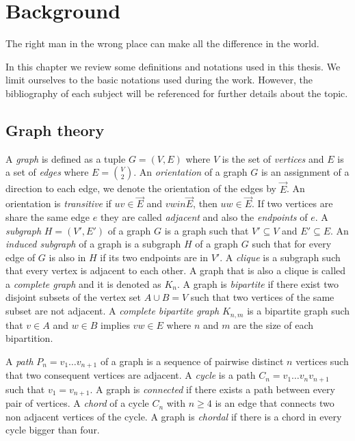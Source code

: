 \chapter{Background}
\label{chap:background}

\begin{fquote}
  The right man in the wrong place can make all the difference in the world.
\end{fquote}

In this chapter we review some definitions and notations used in this thesis. We limit ourselves to the basic notations used during the work. However, the bibliography of each subject will be referenced for further details about the topic.


%
%
%

\section{Graph theory}

A \emph{graph} is defined as a tuple $G = (V,E)$ where $V$ is the set of \emph{vertices} and $E$ is a set of \emph{edges} where $E = \binom{V}{2}$. An \emph{orientation} of a graph $G$ is an assignment of a direction to each edge, we denote the orientation of the edges by $\overrightarrow{E}$. An orientation is \emph{transitive} if $uv \in \overrightarrow{E}$ and $vw in \overrightarrow{E}$, then $uw \in \overrightarrow{E}$. If two vertices are share the same edge $e$ they are called \emph{adjacent} and also the \emph{endpoints} of $e$. A \emph{subgraph} $H = (V', E')$ of a graph $G$ is a graph such that $V' \subseteq V$ and $E' \subseteq E$. An \emph{induced subgraph} of a graph is a subgraph $H$ of a graph $G$ such that for every edge of $G$ is also in $H$ if its two endpoints are in $V'$. A \emph{clique} is a subgraph such that every vertex is adjacent to each other. A graph that is also a clique is called a \emph{complete graph} and it is denoted as $K_n$. A graph is \emph{bipartite} if there exist two disjoint subsets of the vertex set $A \cup B = V$ such that two vertices of the same subset are not adjacent. A \emph{complete bipartite graph} $K_{n,m}$ is a bipartite graph such that $v \in A$ and $w \in B$ implies $vw \in E$ where $n$ and $m$ are the size of each bipartition.

A \emph{path} $P_n = v_1\dots v_{n+1}$ of a graph is a sequence of pairwise distinct $n$ vertices such that two consequent vertices are adjacent. A \emph{cycle} is a path $C_n = v_1\dots v_nv_{n+1}$ such that $v_1=v_{n+1}$. A graph is \emph{connected} if there exists a path between every pair of vertices. A \emph{chord} of a cycle $C_n$ with $n \geqslant 4$ is an edge that connects two non adjacent vertices of the cycle. A graph is \emph{chordal} if there is a chord in every cycle bigger than four.

